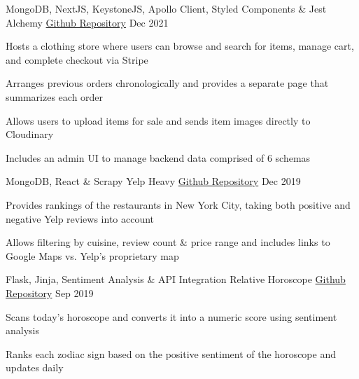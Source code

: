 

\begin{cventries}

  \cventry
  {MongoDB, NextJS, KeystoneJS, Apollo Client, Styled Components \& Jest} %
  {Alchemy} %
  {\href{https://github.com/ysmike/alchemy}{Github Repository}} %
  {Dec 2021} %
  {
    \begin{cvitems} %
      \item {Hosts a clothing store where users can browse and search for items, manage cart, and complete checkout via Stripe}
      \item {Arranges previous orders chronologically and provides a separate page that summarizes each order}
      \item {Allows users to upload items for sale and sends item images directly to Cloudinary}
      \item {Includes an admin UI to manage backend data comprised of 6 schemas}
    \end{cvitems}
  }

  \cventry
  {MongoDB, React \& Scrapy} %
  {Yelp Heavy} %
  {\href{https://github.com/ysmike/yelp-heavy}{Github Repository}} %
  {Dec 2019} %
  {
    \begin{cvitems} %
      \item {Provides rankings of the restaurants in New York City, taking both positive and negative Yelp reviews into account}
      \item {Allows filtering by cuisine, review count \& price range and includes links to Google Maps vs. Yelp's proprietary map}
    \end{cvitems}
  }

  \cventry
  {Flask, Jinja, Sentiment Analysis \& API Integration} %
  {Relative Horoscope} %
  {\href{https://github.com/ysmike/relative-horoscope}{Github Repository}} %
  {Sep 2019} %
  {
    \begin{cvitems} %
      \item {Scans today's horoscope and converts it into a numeric score using sentiment analysis}
      \item {Ranks each zodiac sign based on the positive sentiment of the horoscope and updates daily}
    \end{cvitems}
  }

\end{cventries}